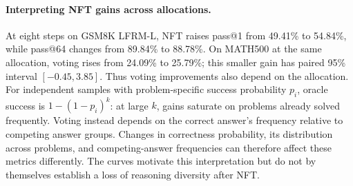 \documentclass{article}
\begin{document}
\paragraph{Interpreting NFT gains across allocations.}
At eight steps on GSM8K LFRM-L, NFT raises pass@1 from 49.41\% to 54.84\%, while pass@64 changes from 89.84\% to 88.78\%. On MATH500 at the same allocation, voting rises from 24.09\% to 25.79\%; this smaller gain has paired 95\% interval $[-0.45,3.85]$. Thus voting improvements also depend on the allocation. For independent samples with problem-specific success probability $p_i$, oracle success is $1-(1-p_i)^k$: at large $k$, gains saturate on problems already solved frequently. Voting instead depends on the correct answer's frequency relative to competing answer groups. Changes in correctness probability, its distribution across problems, and competing-answer frequencies can therefore affect these metrics differently. The curves motivate this interpretation but do not by themselves establish a loss of reasoning diversity after NFT.
\end{document}
